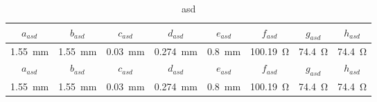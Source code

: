 \begin{table}[h!]
	\centering
	\begin{tabular}{||c|c|c|c|c|c|c|c||}
	\hline\hline
	$a_{asd}$ & $b_{asd}$ & $c_{asd}$ & $d_{asd}$ & $e_{asd}$ & $f_{asd}$ & $g_{asd}$ & $h_{asd}$ \\ 
	\hline
	\SI{1,55}{mm} & \SI{1,55}{mm} & \SI{0,03}{mm} & \SI{0,274}{mm} & \SI{0,8}{mm} & \SI{100,19}{\ohm} & \SI{74,4}{\ohm} & \SI{74,4}{\ohm}\\
	\hline\hline
	$a_{asd}$ & $b_{asd}$ & $c_{asd}$ & $d_{asd}$ & $e_{asd}$ & $f_{asd}$ & $g_{asd}$ & $h_{asd}$ \\
	\hline
	\SI{1,55}{mm} & \SI{1,55}{mm} & \SI{0,03}{mm} & \SI{0,274}{mm} & \SI{0,8}{mm} & \SI{100,19}{\ohm} & \SI{74,4}{\ohm} & \SI{74,4}{\ohm}\\
	\hline\hline
	\end{tabular}
	\caption{asd}
	\label{tab:balun-param}
\end{table}